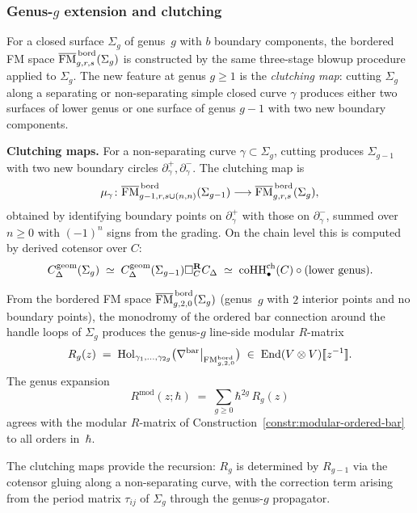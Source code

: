 \subsubsection{Genus-$g$ extension and clutching}

\begin{construction}
\label{constr:genus-g-bordered}
For a closed surface $\Sigma_g$ of genus~$g$ with $b$ boundary
components, the bordered FM space
$\overline{\mathrm{FM}}^{\,\mathrm{bord}}_{g,r,s}(\Sigma_g)$ is constructed
by the same three-stage blowup procedure applied to $\Sigma_g$.
The new feature at genus $g\ge 1$ is the \emph{clutching map}:
cutting $\Sigma_g$ along a separating or non-separating simple
closed curve $\gamma$ produces either two surfaces of lower genus
or one surface of genus $g-1$ with two new boundary components.

\medskip
\noindent\textbf{Clutching maps.}
For a non-separating curve $\gamma\subset\Sigma_g$, cutting
produces $\Sigma_{g-1}$ with two new boundary circles
$\partial_\gamma^+,\partial_\gamma^-$. The clutching map is
\[
\mu_\gamma\colon
\overline{\mathrm{FM}}^{\,\mathrm{bord}}_{g-1,r,s\cup(n,n)}(\Sigma_{g-1})
\longrightarrow
\overline{\mathrm{FM}}^{\,\mathrm{bord}}_{g,r,s}(\Sigma_g),
\]
obtained by identifying boundary points on $\partial_\gamma^+$ with
those on $\partial_\gamma^-$, summed over $n\ge 0$ with
$(-1)^n$ signs from the grading. On the chain level this is
computed by derived cotensor over $C$:
\[
C_\Delta^{\mathrm{geom}}(\Sigma_g)
\;\simeq\;
C_\Delta^{\mathrm{geom}}(\Sigma_{g-1})
\square_C^{\mathbf R}
C_\Delta
\;\simeq\;
\operatorname{coHH}^{\mathrm{ch}}_\bullet(C)\circ(\text{lower genus}).
\]
\end{construction}

\begin{theorem}
\label{thm:genus-g-R-matrix-bordered}
From the bordered FM space
$\overline{\mathrm{FM}}^{\,\mathrm{bord}}_{g,2,0}(\Sigma_g)$ (genus~$g$
with $2$ interior points and no boundary points), the monodromy of
the ordered bar connection around the handle loops of $\Sigma_g$
produces the genus-$g$ line-side modular $R$-matrix
\[
R_g(z)
\;=\;
\operatorname{Hol}_{\gamma_1,\dotsc,\gamma_{2g}}
\bigl(
\nabla^{\mathrm{bar}}\big|_{\mathrm{FM}^{\mathrm{bord}}_{g,2,0}}
\bigr)
\;\in\;
\operatorname{End}(V\otimes V)[\![z^{-1}]\!].
\]
The genus expansion
\[
R^{\mathrm{mod}}(z;\hbar)
\;=\;
\sum_{g\ge 0}\hbar^{2g}\,R_g(z)
\]
agrees with the modular $R$-matrix of
Construction~\textup{\ref{constr:modular-ordered-bar}} to all
orders in~$\hbar$.

The clutching maps provide the recursion: $R_g$ is determined by
$R_{g-1}$ via the cotensor gluing along a non-separating curve,
with the correction term arising from the period matrix
$\tau_{ij}$ of $\Sigma_g$ through the genus-$g$ propagator.
\end{theorem}

